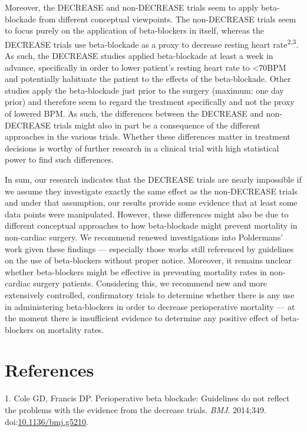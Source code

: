 \documentclass[]{article}
\begin{document}
Moreover, the DECREASE and non-DECREASE trials seem to apply
beta-blockade from different conceptual viewpoints. The non-DECREASE
trials seem to focus purely on the application of beta-blockers in
itself, whereas the DECREASE trials use beta-blockade as a proxy to
decrease resting heart rate\textsuperscript{2,3}. As such, the DECREASE
studies applied beta-blockade at least a week in advance, specifically
in order to lower patient's resting heart rate to \textless{}70BPM and
potentially habituate the patient to the effects of the beta-blockade.
Other studies apply the beta-blockade just prior to the surgery
(maximum: one day prior) and therefore seem to regard the treatment
specifically and not the proxy of lowered BPM. As such, the differences
between the DECREASE and non-DECREASE trials might also in part be a
consequence of the different approaches in the various trials. Whether
these differences matter in treatment decisions is worthy of further
research in a clinical trial with high statistical power to find such
differences.

In sum, our research indicates that the DECREASE trials are nearly
impossible if we assume they investigate exactly the same effect as the
non-DECREASE trials and under that assumption, our results provide some
evidence that at least some data points were manipulated. However, these
differences might also be due to different conceptual approaches to how
beta-blockade might prevent mortality in non-cardiac surgery. We
recommend renewed investigations into Poldermans' work given these
findings --- especially those works still referenced by guidelines on
the use of beta-blockers without proper notice. Moreover, it remains
unclear whether beta-blockers might be effective in preventing mortality
rates in non-cardiac surgery patients. Considering this, we recommend
new and more extensively controlled, confirmatory trials to determine
whether there is any use in administering beta-blockers in order to
decrease perioperative mortality --- at the moment there is insufficient
evidence to determine any positive effect of beta-blockers on mortality
rates.

\section*{References}\label{references}

\hypertarget{refs}{}
\hypertarget{ref-Coleg5210}{}
1. Cole GD, Francis DP. Perioperative beta blockade: Guidelines do not
reflect the problems with the evidence from the decrease trials.
\emph{BMJ}. 2014;349.
doi:\href{https://doi.org/10.1136/bmj.g5210}{10.1136/bmj.g5210}.
\end{document}
